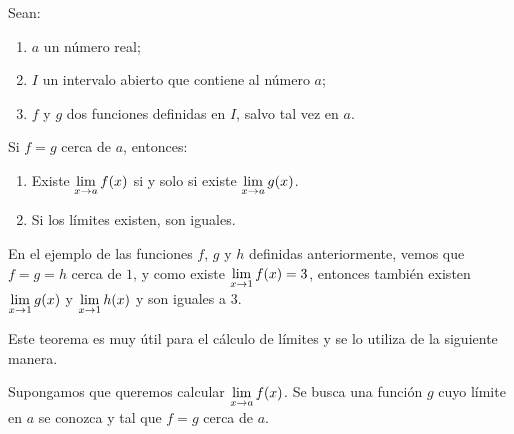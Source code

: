 % 

\begin{teocal}\label{eq:limitegeneral}%
Sean:
\begin{enumerate}
\item[] $a$ un número real;
\item[] $I$ un intervalo abierto que contiene al número $a$;
\item[] $f$ y $g$ dos funciones definidas en $I$, salvo tal vez en $a$.
\end{enumerate}
Si $f=g$ cerca de $a$, entonces:
\begin{enumerate}
      \item Existe $\displaystyle\limjc{f(x)}{x}{a}$ si y solo si existe $\displaystyle\limjc{g(x)}{x}{a}$.
      \item Si los límites existen, son iguales.
\end{enumerate}
\end{teocal}%

En el ejemplo de las funciones $f$, $g$ y $h$ definidas anteriormente, vemos que $f=g=h$ cerca de $1$, y como existe $\displaystyle\limjc{f(x)}{x}{1}=3$, entonces también existen $\displaystyle\limjc{g(x)}{x}{1}$ y $\displaystyle\limjc{h(x)}{x}{1}$ y son iguales a $3$.

Este teorema es muy útil para el cálculo de límites y se lo utiliza de la siguiente manera.

Supongamos que queremos calcular $\displaystyle\limjc{f(x)}{x}{a}$. Se busca una función $g$ cuyo límite en $a$ se conozca y tal que $f=g$ cerca de $a$.

